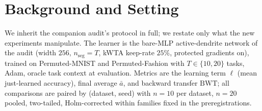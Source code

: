\documentclass[10pt]{article}
\begin{document}
\section{Background and Setting}
\label{sec:setting}

We inherit the companion audit's protocol in full; we restate only what the
new experiments manipulate. The learner is the bare-MLP active-dendrite
network of the audit (width $256$, $n_{\mathrm{seg}}{=}T$, kWTA keep-rate
$25\%$, protected gradients on), trained on Permuted-MNIST and
Permuted-Fashion with $T\in\{10,20\}$ tasks, Adam, oracle task context at
evaluation. Metrics are the learning term $\ell$ (mean just-learned
accuracy), final average $\bar{a}$, and backward transfer
$\mathrm{BWT}$; all comparisons are paired by (dataset, seed) with
$n{=}10$ per dataset, $n{=}20$ pooled, two-tailed, Holm-corrected within
families fixed in the preregistrations.
\end{document}
